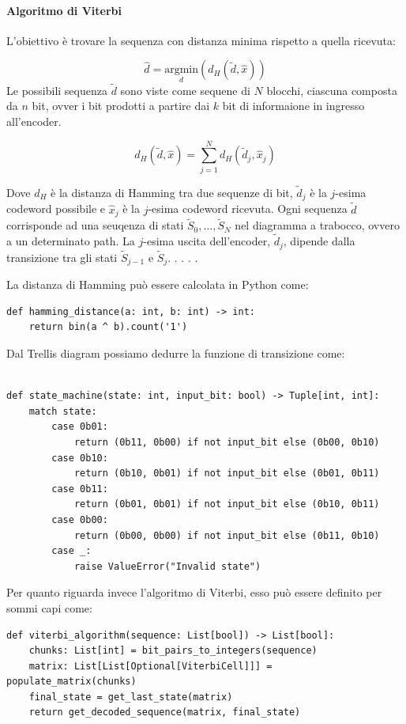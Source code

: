 \paragraph*{Algoritmo di Viterbi}
L'obiettivo è trovare la sequenza con distanza minima rispetto a quella ricevuta:

\[
    \hat{d} = \underset{d}{\text{argmin}} \left( d_H \left(\tilde{d}, \hat{x}\right) \right)
\]
Le possibili sequenza $\tilde{d}$ sono viste come sequene di $N$ blocchi, ciascuna composta da 
$n$ bit, ovver i bit prodotti a partire dai $k$ bit di informaione in ingresso all'encoder.


\[
    d_H\left(\tilde{d}, \hat{x}\right) = \sum_{j=1}^{N} d_H\left(\tilde{d}_j, \hat{x}_j\right)
\]

Dove $d_H$ è la distanza di Hamming tra due sequenze di bit, $\tilde{d}_j$ è la $j$-esima codeword possibile e $\hat{x}_j$ è la $j$-esima codeword ricevuta.
Ogni sequenza $\tilde{d}$ corrisponde ad una seuqenza di stati $\tilde{S}_0, \ldots, \tilde{S}_N$ nel diagramma a trabocco, ovvero a un determinato path. La $j$-esima uscita dell'encoder, $\tilde{d}_j$, dipende dalla transizione tra gli stati $\tilde{S}_{j-1}$ e $\tilde{S}_j$.
.
.
.
.

La distanza di Hamming può essere calcolata in Python come:
\begin{verbatim}
def hamming_distance(a: int, b: int) -> int:
    return bin(a ^ b).count('1')
\end{verbatim}


Dal Trellis diagram possiamo dedurre la funzione di transizione come:
\begin{verbatim}

def state_machine(state: int, input_bit: bool) -> Tuple[int, int]:
    match state:
        case 0b01:
            return (0b11, 0b00) if not input_bit else (0b00, 0b10)
        case 0b10:
            return (0b10, 0b01) if not input_bit else (0b01, 0b11)
        case 0b11:
            return (0b01, 0b01) if not input_bit else (0b10, 0b11)
        case 0b00:
            return (0b00, 0b00) if not input_bit else (0b11, 0b10)
        case _:
            raise ValueError("Invalid state")

\end{verbatim}
Per quanto riguarda invece l'algoritmo di Viterbi, esso può essere definito per sommi capi come:

\begin{verbatim}
def viterbi_algorithm(sequence: List[bool]) -> List[bool]:
    chunks: List[int] = bit_pairs_to_integers(sequence)
    matrix: List[List[Optional[ViterbiCell]]] = populate_matrix(chunks)
    final_state = get_last_state(matrix)
    return get_decoded_sequence(matrix, final_state)
\end{verbatim}

